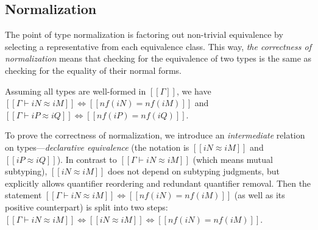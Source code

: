 \subsection{Normalization}
    The point of type normalization is factoring out non-trivial equivalence 
    by selecting a representative from each equivalence class.
    This way, \emph{the correctness of normalization} means that
    checking for the equivalence of two types is the same as checking for the equality of their normal forms.
    \begin{lemma*}
        Assuming all types are well-formed in $[[Γ]]$, we have
            $[[Γ ⊢ iN ≈ iM]] \iff [[nf(iN) = nf(iM)]]$ and 
            $[[Γ ⊢ iP ≈ iQ]] \iff [[nf(iP) = nf(iQ)]]$.
    \end{lemma*}
    To prove the correctness of normalization, 
    we introduce an \emph{intermediate} relation on types---\emph{declarative equivalence}
    (the notation is $[[iN ≈ iM]]$ and $[[iP ≈ iQ]]$).
    In contrast to $[[Γ ⊢ iN ≈ iM]]$ (which means mutual subtyping), 
    $[[iN ≈ iM]]$ does not depend on subtyping judgments, 
    but explicitly allows quantifier reordering and redundant quantifier removal.
    Then the statement $[[Γ ⊢ iN ≈ iM]] \iff [[nf(iN) = nf(iM)]]$ (as well as its positive counterpart) 
    is split into two steps: $[[Γ ⊢ iN ≈ iM]] \iff [[iN ≈ iM]] \iff [[nf(iN) = nf(iM)]]$.





